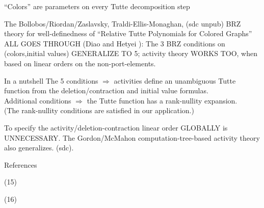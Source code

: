 \documentclass{article}
\newcommand{\Remph}[1]{{\color{red}#1}}
\begin{document}
\begin{frame}{``Colors'' are parameters on every Tutte decomposition step}

The Bollobos/Riordan/Zaslavsky\cite{BollobasRiordanTuttePolyColored,MR93a:05047}, Traldi-Ellis-Monaghan\cite{Ellis-Monaghan-Traldi}, (sdc unpub)
BRZ theory for well-definedness
of ``Relative Tutte Polynomials for Colored Graphs'' ALL GOES THROUGH 
(Diao and Hetyei \cite{RelTuttePoly}):
The 3 BRZ conditions on (colors,initial values) GENERALIZE TO 5;
activity theory WORKS TOO, when
based on linear orders on the non-port-elements.

\begin{block}{In a nutshell}
The 5 conditions $\Longrightarrow$ activities define an 
unambiguous Tutte function 
from the deletion/contraction and initial value formulas.\\

Additional conditions $\Longrightarrow$ the Tutte function has a rank-nullity
expansion.\\

\Remph{
(The rank-nullity conditions are satisfied in our application.)}
\end{block}

\begin{block}{To specify the activity/deletion-contraction linear 
order GLOBALLY is 
UNNECESSARY.}
The Gordon/McMahon computation-tree-based 
activity theory also generalizes. (sdc).
\end{block}
\end{frame}


\begin{frame}[allowframebreaks]{References}

{}
\end{frame}




\begin{frame}{(15)}

\end{frame}

\begin{frame}{(16)}
\end{frame}
\end{document}
